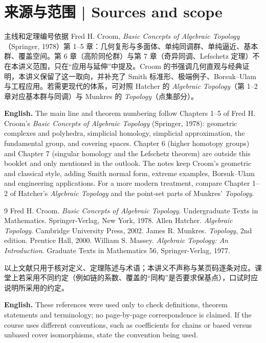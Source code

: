 \documentclass[UTF8,11pt,a4paper]{ctexart}
\newcommand{\EN}[1]{\par\noindent\textbf{English.} #1\par}
\begin{document}
\section*{来源与范围 | Sources and scope}
主线和定理编号依据 Fred H. Croom, \emph{Basic Concepts of Algebraic Topology}（Springer, 1978）第 1--5 章：几何复形与多面体、单纯同调群、单纯逼近、基本群、覆盖空间。第 6 章（高阶同伦群）与第 7 章（奇异同调、Lefschetz 定理）不在本讲义范围，只在“应用与延伸”中提及。Croom 的书强调几何直观与经典证明，本讲义保留了这一取向，并补充了 Smith 标准形、极端例子、Borsuk--Ulam 与工程应用。若需更现代的体系，可对照 Hatcher 的 \emph{Algebraic Topology}（第 1--2 章对应基本群与同调）与 Munkres 的 \emph{Topology}（点集部分）。
\EN{The main line and theorem numbering follow Chapters 1--5 of Fred H. Croom's \emph{Basic Concepts of Algebraic Topology} (Springer, 1978): geometric complexes and polyhedra, simplicial homology, simplicial approximation, the fundamental group, and covering spaces. Chapter 6 (higher homotopy groups) and Chapter 7 (singular homology and the Lefschetz theorem) are outside this booklet and only mentioned in the outlook. The notes keep Croom's geometric and classical style, adding Smith normal form, extreme examples, Borsuk--Ulam and engineering applications. For a more modern treatment, compare Chapter 1--2 of Hatcher's \emph{Algebraic Topology} and the point-set parts of Munkres' \emph{Topology}.}

\begingroup
\renewcommand{\refname}{参考文献 | References}
\begin{thebibliography}{9}
 Fred H. Croom. \emph{Basic Concepts of Algebraic Topology}. Undergraduate Texts in Mathematics. Springer-Verlag, New York, 1978.
 Allen Hatcher. \emph{Algebraic Topology}. Cambridge University Press, 2002.
 James R. Munkres. \emph{Topology}, 2nd edition. Prentice Hall, 2000.
 William S. Massey. \emph{Algebraic Topology: An Introduction}. Graduate Texts in Mathematics 56, Springer-Verlag, 1977.
\end{thebibliography}
\endgroup
\noindent 以上文献只用于核对定义、定理陈述与术语；本讲义不声称与某页码逐条对应。课堂上若采用不同约定（例如链的系数、覆盖的“同构”是否要求保基点），口试时应说明所采用的约定。
\EN{These references were used only to check definitions, theorem statements and terminology; no page-by-page correspondence is claimed. If the course uses different conventions, such as coefficients for chains or based versus unbased cover isomorphisms, state the convention being used.}
\end{document}
